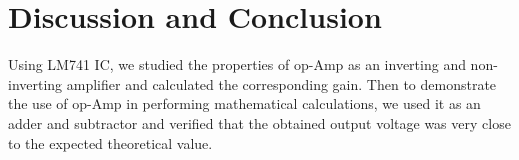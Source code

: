 \documentclass{scrartcl}
\begin{document}
\section{Discussion and Conclusion} 
Using LM741 IC, we studied the properties of op-Amp as an inverting and non-inverting amplifier and calculated the corresponding gain. Then to demonstrate the use of op-Amp in performing mathematical calculations, we used it as an adder and subtractor and verified that the obtained output voltage was very close to the expected theoretical value. 
\end{document}
